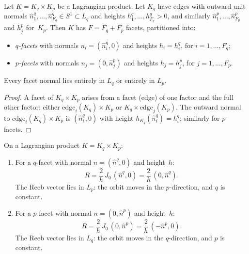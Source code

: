 \begin{lemma}\label{lem:lagrangian-facets}
Let $K = K_q \times K_p$ be a Lagrangian product.
Let $K_q$ have edges with outward unit normals
$\hat{n}_1^q, \ldots, \hat{n}_{F_q}^q \in S^1 \subset L_q$
and heights $h_1^q, \ldots, h_{F_q}^q > 0$,
and similarly $\hat{n}_1^p, \ldots, \hat{n}_{F_p}^p$ and $h_j^p$ for~$K_p$.
Then $K$ has $F = F_q + F_p$ facets, partitioned into:
\begin{itemize}
\item \emph{$q$-facets} with normals $n_i = (\hat{n}_i^q, 0)$
  and heights $h_i = h_i^q$, for $i = 1, \ldots, F_q$;
\item \emph{$p$-facets} with normals $n_j = (0, \hat{n}_j^p)$
  and heights $h_j = h_j^p$, for $j = 1, \ldots, F_p$.
\end{itemize}
Every facet normal lies entirely in $L_q$ or entirely in $L_p$.
\end{lemma}

\begin{proof}
A facet of $K_q \times K_p$ arises from a facet (edge) of
one factor and the full other factor: either
$\text{edge}_i(K_q) \times K_p$ or $K_q \times \text{edge}_j(K_p)$.
The outward normal to $\text{edge}_i(K_q) \times K_p$ is
$(\hat{n}_i^q, 0)$ with height $h_{K_q}(\hat{n}_i^q) = h_i^q$;
similarly for $p$-facets.
\end{proof}

\begin{lemma}\label{lem:lagrangian-reeb}
On a Lagrangian product $K = K_q \times K_p$:
\begin{enumerate}
\item For a $q$-facet with normal $n = (\hat{n}^q, 0)$ and height~$h$:
  \[
    R = \frac{2}{h}\, J_0\, (\hat{n}^q, 0) = \frac{2}{h}\, (0, \hat{n}^q).
  \]
  The Reeb vector lies in $L_p$: the orbit moves in the $p$-direction,
  and $q$ is constant.

\item For a $p$-facet with normal $n = (0, \hat{n}^p)$ and height~$h$:
  \[
    R = \frac{2}{h}\, J_0\, (0, \hat{n}^p) = \frac{2}{h}\, (-\hat{n}^p, 0).
  \]
  The Reeb vector lies in $L_q$: the orbit moves in the $q$-direction,
  and $p$ is constant.
\end{enumerate}
\end{lemma}

